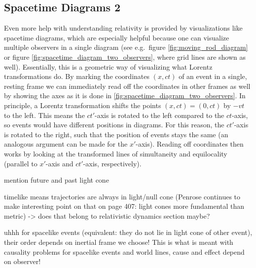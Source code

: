 		\subsection{Spacetime Diagrams 2}
Even more help with understanding relativity is provided by visualizations like spacetime diagrams, which are especially helpful because one can visualize multiple observers in a single diagram (see e.g.~figure \ref{fig:moving_rod_diagram} or figure \ref{fig:spacetime_diagram_two_observers}, where grid lines are shown as well). Essentially, this is a geometric way of visualizing what Lorentz transformations do. By marking the coordinates $(x, ct)$ of an event in a single, resting frame we can immediately read off the coordinates in other frames as well by showing the axes as it is done in \ref{fig:spacetime_diagram_two_observers}. In principle, a Lorentz transformation shifts the points $(x, ct) = (0, ct)$ by $-vt$ to the left. This means the $ct'$-axis is rotated to the left compared to the $ct$-axis, so events would have different positions in diagrams. For this reason, the $ct'$-axis is rotated to the right, such that the position of events stays the same (an analogous argument can be made for the $x'$-axis). Reading off coordinates then works by looking at the transformed lines of simultaneity and equilocality (parallel to $x'$-axis and $ct'$-axis, respectively).




mention future and past light cone


timelike means trajectories are always in light/null cone (Penrose continues to make interesting point on that on page 407: light cones more fundamental than metric) -> does that belong to relativistic dynamics section maybe?


uhhh for spacelike events (equivalent: they do not lie in light cone of other event), their order depends on inertial frame we choose! This is what is meant with causality problems for spacelike events and world lines, cause and effect depend on observer!


